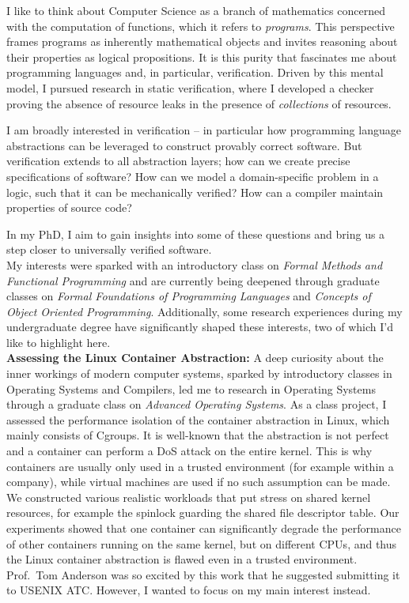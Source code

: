 \documentclass{article}
\begin{document}
I like to think about Computer Science as a branch of mathematics concerned with the computation of functions, which it refers to \emph{programs}. This perspective frames programs as inherently mathematical objects and invites reasoning about their properties as logical propositions. It is this purity that fascinates me about programming languages and, in particular, verification. Driven by this mental model, I pursued research in static verification, where I developed a checker proving the absence of resource leaks in the presence of \emph{collections} of resources.

I am broadly interested in verification -- in particular how programming language abstractions can be leveraged to construct provably correct software. But verification extends to all abstraction layers; how can we create precise specifications of software? How can we model a domain-specific problem in a logic, such that it can be mechanically verified? How can a compiler maintain properties of source code?

In my PhD, I aim to gain insights into some of these questions and bring us a step closer to universally verified software.\\

My interests were sparked with an introductory class on \emph{Formal Methods and Functional Programming} and are currently being deepened through graduate classes on \emph{Formal Foundations of Programming Languages} and \emph{Concepts of Object Oriented Programming}. Additionally, some research experiences during my undergraduate degree have significantly shaped these interests, two of which I'd like to highlight here.\\

\textbf{Assessing the Linux Container Abstraction:}
A deep curiosity about the inner workings of modern
computer systems, sparked by introductory classes in Operating Systems and Compilers, led me to research in Operating Systems through a graduate class on \emph{Advanced Operating Systems}. As a class project, I assessed the performance isolation of the container abstraction in Linux, which mainly consists of Cgroups. It is well-known that the abstraction is not perfect and a container can perform a DoS attack on the entire kernel. This is why containers are usually only used in a trusted environment (for example within a company), while virtual machines are used if no such assumption can be made. We constructed various realistic workloads that put stress on shared kernel resources, for example the spinlock guarding the shared file descriptor table. Our experiments showed that one container can significantly degrade the performance of other containers running on the same kernel, but on different CPUs, and thus the Linux container abstraction is flawed even in a trusted environment.
Prof.\ Tom Anderson was so excited by this work that he suggested submitting it to USENIX ATC. However, I wanted to focus on my main interest instead.\\
\end{document}
